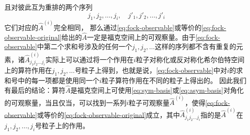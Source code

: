 \documentclass[hyperref, UTF8, a4paper]{ctexart}
\begin{document}
且对彼此互为重排的两个序列
\[
    j_1, j_2, \ldots, j_i, \quad j'_1, j'_2, \ldots, j'_i
\]
它们对应的$\hat{A}^{(i)}$完全相同，
那么通过\eqref{eq:fock-observable}或等价的\eqref{eq:fock-observable-original}给出的$\hat{A}$一定是福克空间上的可观察量。由于\eqref{eq:fock-observable}中第二个求和号涉及的任何一个$j_1, j_2, \ldots$这样的序列都不含有重复的元素，诸$\hat{A}^{(i)}_{j_1 j_2 \ldots j_i}$实际上可以通过将一个作用在$i$粒子对称化或反对称化希尔伯特空间上的算符作用在$j_1, j_2, \ldots$号粒子上得到，也就是说，\eqref{eq:fock-observable}中对$i$的求和号中的每一项都是使用同一个$i$粒子算符作用在不同的粒子上得出的。
因此我们有最后的结论：算符$\hat{A}$是福克空间上可使用\eqref{eq:sym-basis}或\eqref{eq:asym-basis}对角化的可观察量，当且仅当，可以找到一系列$i$粒子可观察量$\hat{A}^{(i)}$，使得\eqref{eq:fock-observable}或等价的\eqref{eq:fock-observable-original}成立，其中$\hat{A}^{(i)}_{j_1 j_2 \ldots j_i}$指的是$\hat{A}^{(i)}$在$j_1, j_2, \ldots, j_i$号粒子上的作用。
\end{document}
